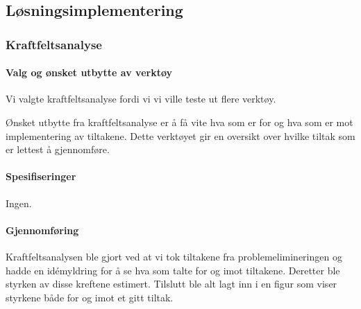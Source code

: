 \subsection{Løsningsimplementering}
\subsubsection{Kraftfeltsanalyse}

\paragraph{Valg og ønsket utbytte av verktøy}
Vi valgte kraftfeltsanalyse fordi vi vi ville teste ut flere verktøy.

Ønsket utbytte fra kraftfeltsanalyse er å få vite hva som er for og hva som er mot implementering av tiltakene. Dette verktøyet gir en oversikt over hvilke tiltak som er lettest å gjennomføre.

\paragraph{Spesifiseringer}
Ingen.

\paragraph{Gjennomføring}
Kraftfeltsanalysen ble gjort ved at vi tok tiltakene fra problemelimineringen og hadde en idémyldring for å se hva som talte for og imot tiltakene. Deretter ble styrken av disse kreftene estimert. Tilslutt ble alt lagt inn i en figur som viser styrkene både for og imot et gitt tiltak. 
